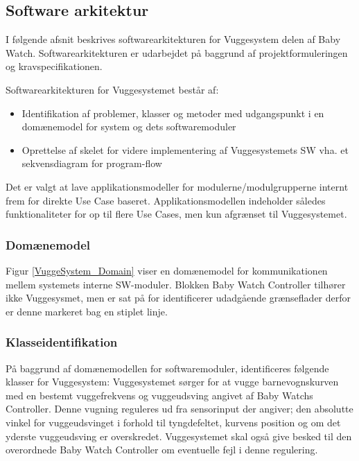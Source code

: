 \newpage
\subsection{Software arkitektur}

I følgende afsnit beskrives softwarearkitekturen for Vuggesystem delen af Baby Watch. Softwarearkitekturen er udarbejdet på baggrund af projektformuleringen og kravspecifikationen. 

\vspace{5mm}

Softwarearkitekturen for Vuggesystemet består af: 
\begin{itemize}
\item Identifikation af problemer, klasser og metoder med udgangspunkt i en domænemodel for system og dets softwaremoduler  
\item Oprettelse af skelet for videre implementering af Vuggesystemets SW vha. et sekvensdiagram for program-flow 
\end{itemize}

Det er valgt at lave applikationsmodeller for modulerne/modulgrupperne internt frem for direkte Use Case baseret. Applikationsmodellen indeholder således funktionaliteter for op til flere Use Cases, men kun afgrænset til Vuggesystemet. 

\vspace{5mm}
\subsubsection*{Domænemodel} 


\vspace{1mm}
Figur \ref{VuggeSystem_Domain} viser en domænemodel for kommunikationen mellem systemets interne SW-moduler. Blokken Baby Watch Controller tilhører ikke Vuggesysmet, men er sat på for identificerer udadgående grænseflader derfor er denne markeret bag en stiplet linje.

\subsubsection*{Klasseidentifikation}
På baggrund af domænemodellen for softwaremoduler, identificeres følgende klasser for Vuggesystem:
Vuggesystemet sørger for at vugge barnevognskurven med en bestemt vuggefrekvens og vuggeudsving angivet af Baby Watchs Controller. Denne vugning reguleres ud fra sensorinput der angiver; den absolutte vinkel for vuggeudsvinget i forhold til tyngdefeltet, kurvens position og om det yderste vuggeudsving er overskredet. Vuggesystemet skal også give besked til den overordnede Baby Watch Controller om eventuelle fejl i denne regulering.

